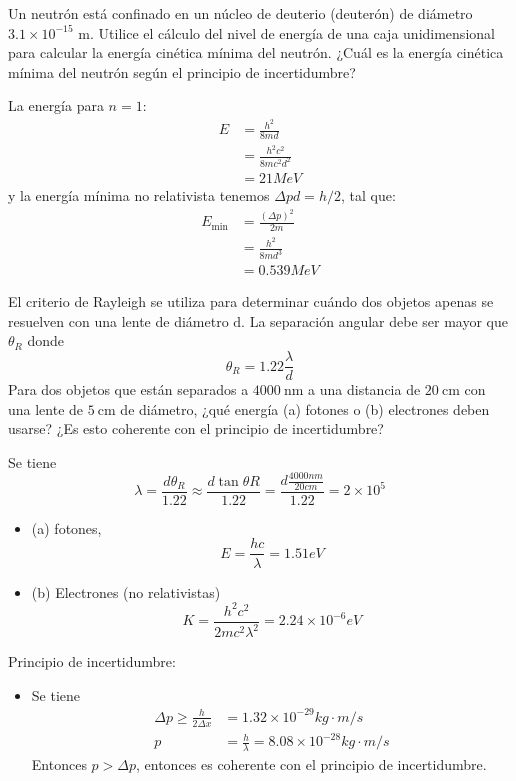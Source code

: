 \begin{problema}
    Un neutrón está confinado en un núcleo de deuterio (deuterón) de diámetro $3.1 \times 10^{-15}$ m. Utilice el cálculo del nivel de energía de una caja unidimensional para calcular la energía cinética mínima del neutrón. ¿Cuál es la energía cinética mínima del neutrón según el principio de incertidumbre?
    \begin{sol}
        La energía para $n=1$: 
        \begin{align*}
            E &= \frac{h^2}{8md}\\
              &= \frac{h^2c^2}{8mc^2d^2}\\
              &= 21 MeV
        \end{align*}
        y la energía mínima no relativista tenemos $\Delta p d = h/2$, 
        tal que: 
        \begin{align*}
            E_{\min} &= \frac{(\Delta p)^2}{2m}\\
                   &= \frac{h^2}{8md^3}\\
                   &= 0.539 MeV 
        \end{align*}
    \end{sol}
\end{problema}

\begin{problema}
    El criterio de Rayleigh se utiliza para determinar cuándo dos objetos apenas se resuelven con una lente de diámetro $\mathrm{d}$. La separación angular debe ser mayor que $\theta_{R}$ donde
    $$\theta_{R}=1.22 \frac{\lambda}{d}$$
    Para dos objetos que están separados a $4000 \mathrm{~nm}$ a una distancia de $20 \mathrm{~cm}$ con una lente de $5 \mathrm{~cm}$ de diámetro, ¿qué energía (a) fotones o (b) electrones deben usarse? ¿Es esto coherente con el principio de incertidumbre?
    \begin{sol}
        Se tiene 
        $$\lambda =\frac{d\theta_R}{1.22} \approx\frac{d\tan \theta R}{1.22}=\frac{d\frac{4000nm}{20cm}}{1.22}=2\times 10^5 $$
        \begin{itemize}
            \item (a) fotones, 
            $$E=\frac{hc}{\lambda} = 1.51eV$$
            \item (b) Electrones (no relativistas)
            $$K=\frac{h^2c^2}{2mc^2\lambda^2}= 2.24\times 10^{-6}eV$$
        \end{itemize}
        \item Principio de incertidumbre: 
        \begin{itemize}
            \item Se tiene
            \begin{align*}
                \Delta p\geq \frac{h}{2\Delta x}&= 1.32\times 10^{-29}kg\cdot m/s\\
                p&=\frac{h}{\lambda} =8.08\times 10^{-28}kg\cdot m/s
            \end{align*}
            Entonces $p>\Delta p$, entonces es coherente con el principio de incertidumbre.
        \end{itemize}
    \end{sol}
\end{problema}

